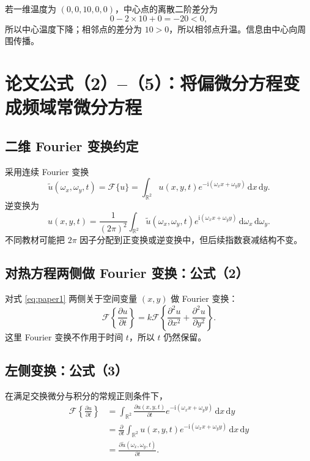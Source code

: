 \documentclass[UTF8,12pt,a4paper,fontset=none]{ctexart}
\numberwithin{equation}{section}
\newcommand{\R}{\mathbb{R}}
\newcommand{\F}{\mathcal{F}}
\newcommand{\od}{\mathrm{d}}
\newcommand{\pd}{\partial}
\begin{document}
\begin{examplebox}[一个最小数值例子]
若一维温度为 $(0,0,10,0,0)$，中心点的离散二阶差分为
\begin{equation}
  0-2\times10+0=-20<0,
\end{equation}
所以中心温度下降；相邻点的差分为 $10>0$，所以相邻点升温。信息由中心向周围传播。
\end{examplebox}

\section{论文公式（2）--（5）：将偏微分方程变成频域常微分方程}

\subsection{二维 Fourier 变换约定}

采用连续 Fourier 变换
\begin{equation}
  \widetilde u(\omega_x,\omega_y,t)
  =\F\{u\}
  =\int_{\R^2}u(x,y,t)
  e^{-\mathrm{i}(\omega_xx+\omega_yy)}\,\od x\,\od y.
  \label{eq:ft-def}
\end{equation}
逆变换为
\begin{equation}
  u(x,y,t)
  =\frac{1}{(2\pi)^2}
  \int_{\R^2}\widetilde u(\omega_x,\omega_y,t)
  e^{\mathrm{i}(\omega_xx+\omega_yy)}\,
  \od\omega_x\,\od\omega_y.
\end{equation}
不同教材可能把 $2\pi$ 因子分配到正变换或逆变换中，但后续指数衰减结构不变。

\subsection{对热方程两侧做 Fourier 变换：公式（2）}

对式 \eqref{eq:paper1} 两侧关于空间变量 $(x,y)$ 做 Fourier 变换：
\begin{equation}
  \F\left\{\frac{\pd u}{\pd t}\right\}
  =k\F\left\{
  \frac{\pd^2u}{\pd x^2}
  +\frac{\pd^2u}{\pd y^2}
  \right\}.
  \tag{2}
  \label{eq:paper2}
\end{equation}
这里 Fourier 变换不作用于时间 $t$，所以 $t$ 仍然保留。

\subsection{左侧变换：公式（3）}

在满足交换微分与积分的常规正则条件下，
\begin{align}
  \F\left\{\frac{\pd u}{\pd t}\right\}
  &=\int_{\R^2}
  \frac{\pd u(x,y,t)}{\pd t}
  e^{-\mathrm{i}(\omega_xx+\omega_yy)}\,\od x\,\od y\\
  &=\frac{\pd}{\pd t}
  \int_{\R^2}u(x,y,t)
  e^{-\mathrm{i}(\omega_xx+\omega_yy)}\,\od x\,\od y\\
  &=\frac{\pd\widetilde u(\omega_x,\omega_y,t)}{\pd t}.
  \tag{3}
  \label{eq:paper3}
\end{align}
\end{document}
